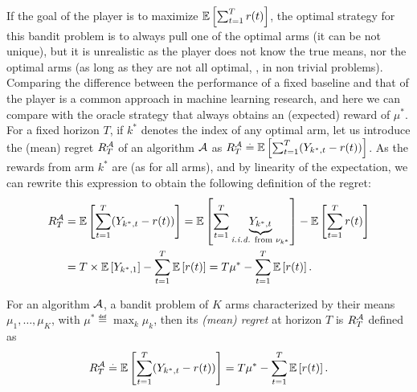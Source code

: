 If the goal of the player is to maximize $\mathbb{E}\left[\sum_{t=1}^T r(t)\right]$,
the optimal strategy for this bandit problem is to always pull one of the optimal arms (it can be not unique), but it is unrealistic as the player does not know the true means, nor the optimal arms (as long as they are not all optimal, \ie, in non trivial problems).
%
Comparing the difference between the performance of a fixed baseline and that of the player is a common approach in machine learning research,
and here we can compare with the oracle strategy that always obtains an (expected) reward of $\mu^*$.
%
For a fixed horizon $T$, if $k^*$ denotes the index of any optimal arm,
let us introduce the (mean) regret $R_T^{\mathcal{A}}$ of an algorithm $\mathcal{A}$ as
$R_T^{\mathcal{A}} \overset{.}{=} \mathbb{E}\left[ \sum_{t=1}^T (Y_{k^*,t} - r(t)) \right]$.
%
As the rewards from arm $k^*$ are \iid{} (as for all arms), and by linearity of the expectation, we can rewrite this expression to obtain the following definition of the regret:
\begin{align*}
    R_T^{\mathcal{A}}
    & = \mathbb{E}\left[ \sum_{t=1}^T (Y_{k^*,t} - r(t)) \right]
    = \mathbb{E}\left[ \sum_{t=1}^T \underbrace{Y_{k^*,t}}_{\text{\emph{i.i.d.}{} from $\nu_{k^*}$}} \right] - \mathbb{E}\left[ \sum_{t=1}^T r(t) \right] \\
    & = T \times \mathbb{E}\left[ Y_{k^*,1} \right] - \sum_{t=1}^T \mathbb{E}\left[ r(t) \right]
    = T \mu^* - \sum_{t=1}^T \mathbb{E}\left[ r(t) \right].
\end{align*}


\begin{definition}[Regret]\label{def:2:regret}
\begin{leftbar}[defnbar]  %
    For an algorithm $\mathcal{A}$, a bandit problem of $K$ arms characterized by their means $\mu_1,\dots,\mu_K$, with $\mu^* \eqdef \max_k \mu_k$, then its \emph{(mean) regret} at horizon $T$ is $R_T^{\mathcal{A}}$ defined as
    \begin{align}\label{eq:2:regret}
        R_T^{\mathcal{A}}
        \overset{.}{=} \mathbb{E}\left[ \sum_{t=1}^T (Y_{k^*,t} - r(t)) \right]
        = T \mu^* - \sum_{t=1}^T \mathbb{E}\left[ r(t) \right].
    \end{align}
\end{leftbar}  %
\end{definition}

